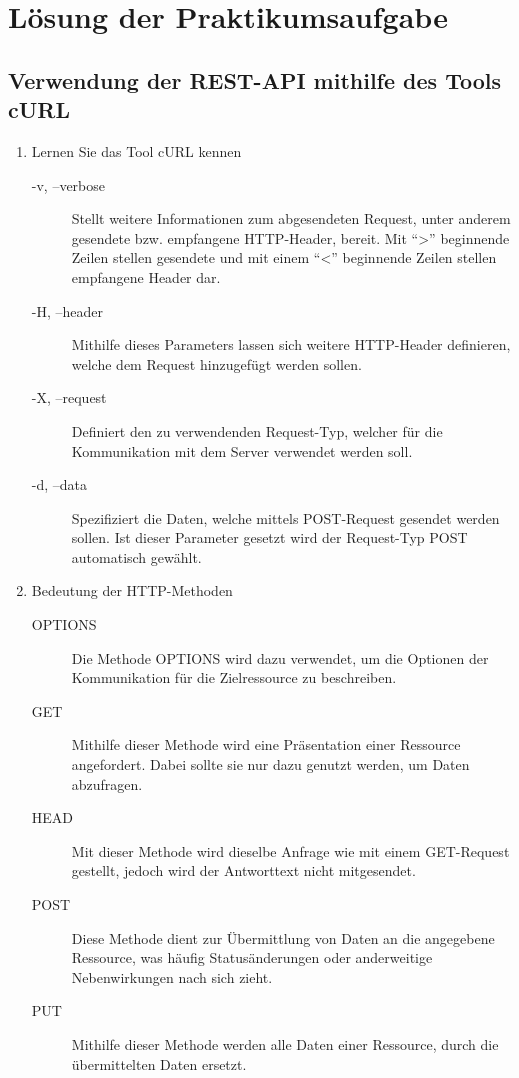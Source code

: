 \chapter{Lösung der Praktikumsaufgabe}
\section{Verwendung der REST-API mithilfe des Tools cURL}
\begin{enumerate}
	\item Lernen Sie das Tool cURL kennen
		\begin{description}
			\item[-v, --verbose] Stellt weitere Informationen zum abgesendeten Request, unter anderem gesendete bzw. empfangene \gls{HTTP}-Header, bereit. Mit \enquote{>} beginnende Zeilen stellen gesendete und mit einem \enquote{<} beginnende Zeilen stellen empfangene Header dar.
			\item[-H, --header] Mithilfe dieses Parameters lassen sich weitere \gls{HTTP}-Header definieren, welche dem Request hinzugefügt werden sollen.
			\item[-X, --request] Definiert den zu verwendenden Request-Typ, welcher für die Kommunikation mit dem Server verwendet werden soll.  
			\item[-d, --data] Spezifiziert die Daten, welche mittels POST-Request gesendet werden sollen. Ist dieser Parameter gesetzt wird der Request-Typ POST automatisch gewählt.
		\end{description}
	\item Bedeutung der HTTP-Methoden
		\begin{description}
			\item[OPTIONS] Die Methode OPTIONS wird dazu verwendet, um die Optionen der Kommunikation für die Zielressource zu beschreiben.
			\item[GET] Mithilfe dieser Methode wird eine Präsentation einer Ressource angefordert. Dabei sollte sie nur dazu genutzt werden, um Daten abzufragen.
			\item[HEAD] Mit dieser Methode wird dieselbe Anfrage wie mit einem GET-Request gestellt, jedoch wird der Antworttext nicht mitgesendet.
			\item[POST] Diese Methode dient zur Übermittlung von Daten an die angegebene Ressource, was häufig Statusänderungen oder anderweitige Nebenwirkungen nach sich zieht. 
			\item[PUT] Mithilfe dieser Methode werden alle Daten einer Ressource, durch die übermittelten Daten ersetzt.

\end{description}
\end{enumerate}
